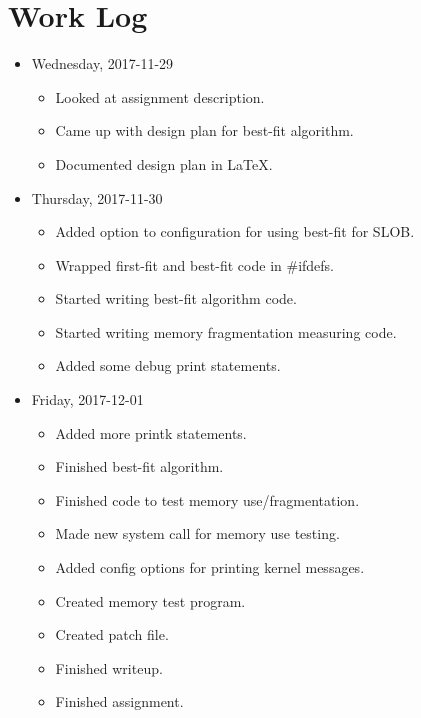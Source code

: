 \documentclass[letterpaper,10pt,titlepage,draftclsnofoot,onecolumn]{article}
\begin{document}
\section{Work Log}
\begin{itemize}
    \item Wednesday, 2017-11-29
    
        \begin{itemize}
            \item Looked at assignment description.
			      \item Came up with design plan for best-fit algorithm.
			      \item Documented design plan in \LaTeX.
        \end{itemize}
    
    \item Thursday, 2017-11-30
    
        \begin{itemize}
            \item Added option to configuration for using best-fit for SLOB.
            \item Wrapped first-fit and best-fit code in \#ifdefs.
			      \item Started writing best-fit algorithm code.
			      \item Started writing memory fragmentation measuring code.
			      \item Added some debug print statements.
        \end{itemize}
        
    \item Friday, 2017-12-01
    
        \begin{itemize}
			      \item Added more printk statements.
            \item Finished best-fit algorithm.
			      \item Finished code to test memory use/fragmentation.
			      \item Made new system call for memory use testing.
				  \item Added config options for printing kernel messages.
				  \item Created memory test program.
			      \item Created patch file.
			      \item Finished writeup.
			      \item Finished assignment.
        \end{itemize}
\end{itemize}
\end{document}
